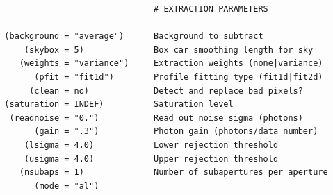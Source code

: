 \begin{verbatim}
                                # EXTRACTION PARAMETERS

  (background = "average")      Background to subtract
      (skybox = 5)              Box car smoothing length for sky
     (weights = "variance")     Extraction weights (none|variance)
        (pfit = "fit1d")        Profile fitting type (fit1d|fit2d)
       (clean = no)             Detect and replace bad pixels?
  (saturation = INDEF)          Saturation level
   (readnoise = "0.")           Read out noise sigma (photons)
        (gain = ".3")           Photon gain (photons/data number)
      (lsigma = 4.0)            Lower rejection threshold
      (usigma = 4.0)            Upper rejection threshold
     (nsubaps = 1)              Number of subapertures per aperture
        (mode = "al")
\end{verbatim}
\endgroup
